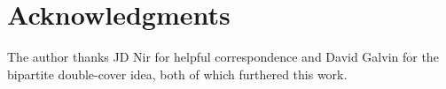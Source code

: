 \section*{Acknowledgments}

The author thanks JD Nir for helpful correspondence and David Galvin
for the bipartite double-cover idea, both of which furthered this work.
